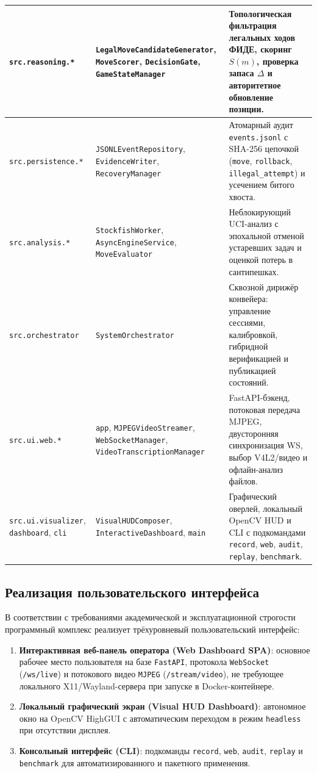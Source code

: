 \begin{longtable}{|>{\raggedright\arraybackslash}p{}|>{\raggedright\arraybackslash}p{}|>{\raggedright\arraybackslash}p{}|}
\hline
\texttt{src.reasoning.*} & \texttt{LegalMoveCandidateGenerator}, \texttt{MoveScorer}, \texttt{DecisionGate}, \texttt{GameStateManager} & Топологическая фильтрация легальных ходов ФИДЕ, скоринг $S(m)$, проверка запаса $\Delta$ и авторитетное обновление позиции. \\
\hline
\texttt{src.persistence.*} & \texttt{JSONLEventRepository}, \texttt{EvidenceWriter}, \texttt{RecoveryManager} & Атомарный аудит \texttt{events.jsonl} с SHA-256 цепочкой (\texttt{move}, \texttt{rollback}, \texttt{illegal\_attempt}) и усечением битого хвоста. \\
\hline
\texttt{src.analysis.*} & \texttt{StockfishWorker}, \texttt{AsyncEngineService}, \texttt{MoveEvaluator} & Неблокирующий UCI-анализ с эпохальной отменой устаревших задач и оценкой потерь в сантипешках. \\
\hline
\texttt{src.orchestrator} & \texttt{SystemOrchestrator} & Сквозной дирижёр конвейера: управление сессиями, калибровкой, гибридной верификацией и публикацией состояний. \\
\hline
\texttt{src.ui.web.*} & \texttt{app}, \texttt{MJPEGVideoStreamer}, \texttt{WebSocketManager}, \texttt{VideoTranscriptionManager} & FastAPI-бэкенд, потоковая передача MJPEG, двусторонняя синхронизация WS, выбор V4L2/видео и офлайн-анализ файлов. \\
\hline
\texttt{src.ui.visualizer}, \texttt{dashboard}, \texttt{cli} & \texttt{VisualHUDComposer}, \texttt{InteractiveDashboard}, \texttt{main} & Графический оверлей, локальный OpenCV HUD и CLI с подкомандами \texttt{record}, \texttt{web}, \texttt{audit}, \texttt{replay}, \texttt{benchmark}. \\
\hline
\end{longtable}

\subsection{Реализация пользовательского интерфейса}

В соответствии с требованиями академической и эксплуатационной строгости программный комплекс реализует трёхуровневый пользовательский интерфейс:
\begin{enumerate}
    \item \textbf{Интерактивная веб-панель оператора (Web Dashboard SPA)}: основное рабочее место пользователя на базе \texttt{FastAPI}, протокола \texttt{WebSocket} (\texttt{/ws/live}) и потокового видео \texttt{MJPEG} (\texttt{/stream/video}), не требующее локального X11/Wayland-сервера при запуске в Docker-контейнере.
    \item \textbf{Локальный графический экран (Visual HUD Dashboard)}: автономное окно на OpenCV HighGUI с автоматическим переходом в режим \texttt{headless} при отсутствии дисплея.
    \item \textbf{Консольный интерфейс (CLI)}: подкоманды \texttt{record}, \texttt{web}, \texttt{audit}, \texttt{replay} и \texttt{benchmark} для автоматизированного и пакетного применения.
\end{enumerate}

